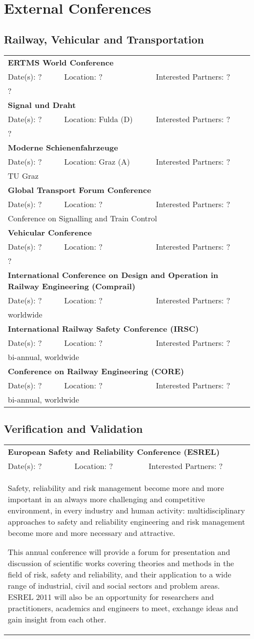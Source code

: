 ﻿\section{External Conferences}

\subsection{Railway, Vehicular and Transportation}

\renewcommand{\tableentry}[5]{\multicolumn{3}{|p{\textwidth}|}{\textbf{#1}}\\Date(s): #2&Location: #3&Interested Partners: #4\\\multicolumn{3}{|p{\textwidth}|}{#5}\\\hline}

\begin{longtable}{|lll|}
 \hline
 \tableentry{ERTMS World Conference}{?}{?}{?}{
	?
 }
 \tableentry{Signal und Draht}{?}{Fulda (D)}{?}{
	?
 }
 \tableentry{Moderne Schienenfahrzeuge}{?}{Graz (A)}{?}{
	TU Graz
 }
 \tableentry{Global Transport Forum Conference}{?}{?}{?}{
	Conference on Signalling and Train Control
 }
 \tableentry{Vehicular Conference}{?}{?}{?}{
	?
 }
 \tableentry{International Conference on Design and Operation in Railway Engineering (Comprail)}{?}{?}{?}{
	worldwide
 }
 \tableentry{International Railway Safety Conference (IRSC)}{?}{?}{?}{
	bi-annual, worldwide
 }
 \tableentry{Conference on Railway Engineering (CORE)}{?}{?}{?}{
	bi-annual, worldwide
 }
\end{longtable}

\subsection{Verification and Validation}


\begin{longtable}{|lll|}
 \hline
 \tableentry{European Safety and Reliability Conference (ESREL)}{?}{?}{?}{
	Safety, reliability and risk management become more and more important in an always more challenging and competitive environment, in every industry and human activity: multidisciplinary approaches to safety and reliability engineering and risk management become more and more necessary and attractive.

	This annual conference will provide a forum for presentation and discussion of scientific works covering theories and methods in the field of risk, safety and reliability, and their application to a wide range of industrial, civil and social sectors and problem areas. ESREL 2011 will also be an opportunity for researchers and practitioners, academics and engineers to meet, exchange ideas and gain insight from each other.
 }
\end{longtable}



